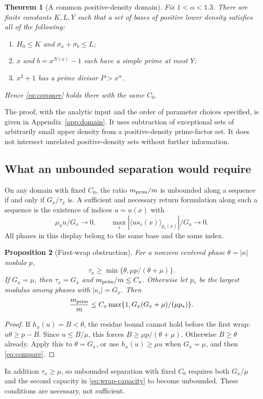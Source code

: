 \documentclass[11pt,a4paper]{article}
\newtheorem{theorem}{Theorem}[section]
\newtheorem{proposition}[theorem]{Proposition}
\theoremstyle{definition}\newtheorem{question}[theorem]{Question}
\theoremstyle{remark}\newtheorem{remark}[theorem]{Remark}
\begin{document}
\begin{theorem}[A common positive-density domain]\label{thm:domain}
Fix $1<\alpha<1.3$. There are finite constants $K,L,Y$ such that
a set of bases of positive lower density satisfies all of the following:
\begin{enumerate}
 \item $H_0\le K$ and $\sigma_x+\sigma_b\le L$;
 \item $x$ and $b=x^{N(x)}-1$ each have a simple prime at most $Y$;
 \item $x^2+1$ has a prime divisor $P>x^\alpha$.
\end{enumerate}
Hence \eqref{eq:compare} holds there with the same $C_0$.
\end{theorem}
The proof, with the analytic input and the order of parameter choices
specified, is given in Appendix~\ref{app:domain}. It uses subtraction
of exceptional sets of arbitrarily small upper density from a
positive-density prime-factor set. It does not intersect unrelated
positive-density sets without further information.

\subsection{What an unbounded separation would require}
On any domain with fixed $C_0$, the ratio $m_{\mathrm{prim}}/m$ is unbounded along
a sequence if and only if $G_x/\tau_x$ is. A sufficient and necessary
return formulation along such a sequence is the existence of indices
$u=u(x)$ with
\begin{equation}\label{eq:required-return}
 \mu_x u/G_x\longrightarrow0,\qquad
 \max_i|\langle u\kappa_i(x)\rangle_{p_i(x)}|/G_x\longrightarrow0.
\end{equation}
All phases in this display belong to the same base and the same index.

\begin{proposition}[First-wrap obstruction]\label{prop:wrap}
For a nonzero centered phase $\theta=|\kappa|$ modulo $p$,
\[
 \tau_x\ge\min\{\theta,\mu p/(\theta+\mu)\}.
\]
If $G_x=\mu$, then $\tau_x=G_x$ and $m_{\mathrm{prim}}/m\le C_x$.
Otherwise let $p_*$ be the largest modulus among phases with
$|\kappa_i|=G_x$. Then
\begin{equation}\label{eq:wrap-capacity}
 \frac{m_{\mathrm{prim}}}{m}\le C_x\max\{1,G_x(G_x+\mu)/(\mu p_*)\}.
\end{equation}
\end{proposition}
\begin{proof}
If $h_x(u)=B<\theta$, the residue bound cannot hold before the first
wrap: $u\theta\ge p-B$. Since $u\le B/\mu$, this forces
$B\ge\mu p/(\theta+\mu)$. Otherwise $B\ge\theta$ already.
Apply this to $\theta=G_x$, or use $h_x(u)\ge\mu u$ when $G_x=\mu$,
and then \eqref{eq:compare}.
\end{proof}
In addition $\tau_x\ge\mu$, so unbounded separation with fixed $C_0$
requires both $G_x/\mu$ and the second capacity in
\eqref{eq:wrap-capacity} to become unbounded. These conditions are
necessary, not sufficient.
\end{document}
